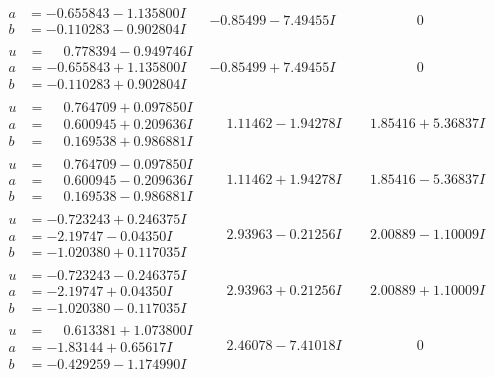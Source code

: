 \documentclass[1p]{elsarticle_modified}
\theoremstyle{definition}
\begin{document}
$$\begin{array}{c|c|c}
\begin{aligned}
a &= -0.655843 - 1.135800 I \\
b &= -0.110283 - 0.902804 I\end{aligned}
 & -0.85499 - 7.49455 I & \phantom{-0.000000 } 0 \\ \hline\begin{aligned}
u &= \phantom{-}0.778394 - 0.949746 I \\
a &= -0.655843 + 1.135800 I \\
b &= -0.110283 + 0.902804 I\end{aligned}
 & -0.85499 + 7.49455 I & \phantom{-0.000000 } 0 \\ \hline\begin{aligned}
u &= \phantom{-}0.764709 + 0.097850 I \\
a &= \phantom{-}0.600945 + 0.209636 I \\
b &= \phantom{-}0.169538 + 0.986881 I\end{aligned}
 & \phantom{-}1.11462 - 1.94278 I & \phantom{-}1.85416 + 5.36837 I \\ \hline\begin{aligned}
u &= \phantom{-}0.764709 - 0.097850 I \\
a &= \phantom{-}0.600945 - 0.209636 I \\
b &= \phantom{-}0.169538 - 0.986881 I\end{aligned}
 & \phantom{-}1.11462 + 1.94278 I & \phantom{-}1.85416 - 5.36837 I \\ \hline\begin{aligned}
u &= -0.723243 + 0.246375 I \\
a &= -2.19747 - 0.04350 I \\
b &= -1.020380 + 0.117035 I\end{aligned}
 & \phantom{-}2.93963 - 0.21256 I & \phantom{-}2.00889 - 1.10009 I \\ \hline\begin{aligned}
u &= -0.723243 - 0.246375 I \\
a &= -2.19747 + 0.04350 I \\
b &= -1.020380 - 0.117035 I\end{aligned}
 & \phantom{-}2.93963 + 0.21256 I & \phantom{-}2.00889 + 1.10009 I \\ \hline\begin{aligned}
u &= \phantom{-}0.613381 + 1.073800 I \\
a &= -1.83144 + 0.65617 I \\
b &= -0.429259 - 1.174990 I\end{aligned}
 & \phantom{-}2.46078 - 7.41018 I & \phantom{-0.000000 } 0 \\ \hline\begin{aligned}

\end{aligned}
\end{array}$$
\end{document}
